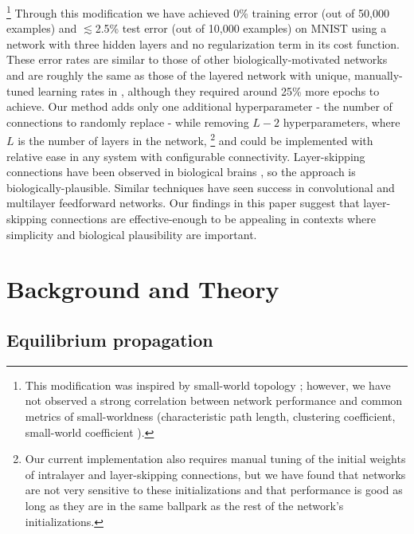 \documentclass[format=sigconf]{acmart}
\begin{document}
\footnote{This modification was inspired by small-world topology \cite{watts98}; however, we have not observed a strong correlation between network performance and common metrics of small-worldness (characteristic path length, clustering coefficient, small-world coefficient \cite{humphries2008}).}
Through this modification we have achieved 0\% training error (out of 50,000 examples) and $\lesssim$2.5\% test error (out of 10,000 examples) on MNIST using a network with three hidden layers and no regularization term in its cost function. These error rates are similar to those of other biologically-motivated networks \cite{bartunov2018} and are roughly the same as those of the layered network with unique, manually-tuned learning rates in \cite{scellier17}, although they required around 25\% more epochs to achieve. Our method adds only one additional hyperparameter - the number of connections to randomly replace - while removing $L-2$ hyperparameters, where $L$ is the number of layers in the network, \footnote{Our current implementation also requires manual tuning of the initial weights of intralayer and layer-skipping connections, but we have found that networks are not very sensitive to these initializations and that performance is good as long as they are in the same ballpark as the rest of the network's initializations.} and could be implemented with relative ease in any system with configurable connectivity. Layer-skipping connections have been observed in biological brains \cite{bullmore2009}, so the approach is biologically-plausible. Similar techniques have seen success in convolutional \cite{he2015, srivastava2015} and multilayer feedforward \cite{xiaohu2011, krishnan2019} networks. Our findings in this paper suggest that layer-skipping connections are effective-enough to be appealing in contexts where simplicity and biological plausibility are important.

\section{Background and Theory}

\subsection{Equilibrium propagation}
\label{sec:eqp_formulation}
\end{document}
